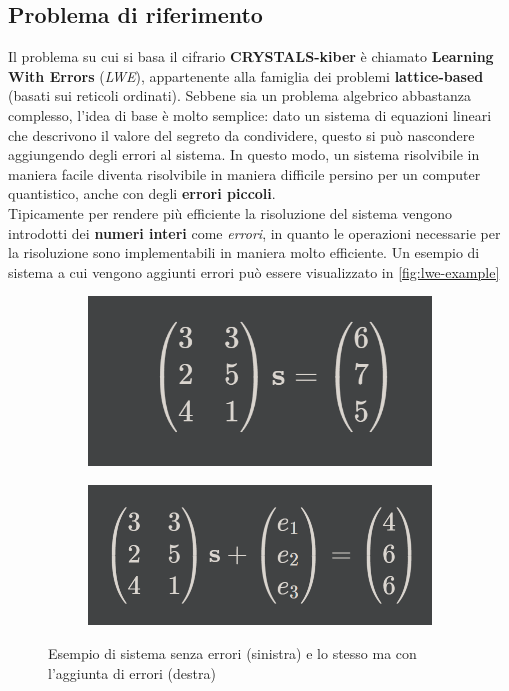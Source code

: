 \subsection{Problema di riferimento}
Il problema su cui si basa il cifrario \textbf{CRYSTALS-kiber} è chiamato \textbf{Learning With Errors} (\emph{LWE}), appartenente alla famiglia dei problemi \textbf{lattice-based} (basati sui reticoli ordinati). Sebbene sia un problema algebrico abbastanza complesso, l'idea di base è molto semplice: dato un sistema di equazioni lineari che descrivono il valore del segreto da condividere, questo si può nascondere aggiungendo degli errori al sistema. In questo modo, un sistema risolvibile in maniera facile diventa risolvibile in maniera difficile persino per un computer quantistico, anche con degli \textbf{errori piccoli}.\\
Tipicamente per rendere più efficiente la risoluzione del sistema vengono introdotti dei \textbf{numeri interi} come \emph{errori}, in quanto le operazioni necessarie per la risoluzione sono implementabili in maniera molto efficiente. Un esempio di sistema a cui vengono aggiunti errori può essere visualizzato in \autoref{fig:lwe-example} \cite{telsy_lwe}

\begin{figure}[h]
    \begin{subfigure}{0.4\textwidth}
        \includegraphics[width=1\textwidth]{capitoli/figure-crittografia/lwe-no-error.png}
    \end{subfigure}
    \hfill
    \begin{subfigure}{0.5\textwidth}
        \includegraphics[width=1\textwidth]{capitoli/figure-crittografia/lwe-with-error.png}
    \end{subfigure}
    \caption{Esempio di sistema senza errori (sinistra) e lo stesso ma con l'aggiunta di errori (destra)}
    \label{fig:lwe-example}
\end{figure}

